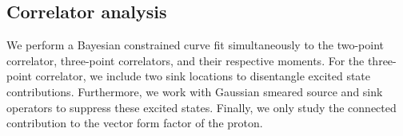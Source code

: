 \documentclass{PoS}
\begin{document}

\subsection{Correlator analysis}
We perform a Bayesian constrained curve fit simultaneously to the two-point correlator, three-point correlators, and their respective moments. For the three-point correlator, we include two sink locations to disentangle excited state contributions. Furthermore, we work with Gaussian smeared source and sink operators to suppress these excited states. Finally, we only study the connected contribution to the vector form factor of the proton.
\end{document}
